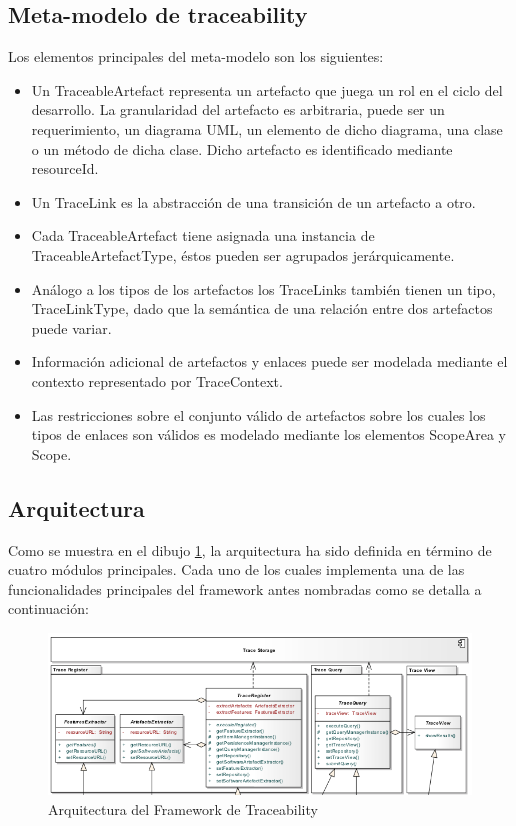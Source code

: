 \documentclass[a4paper,12pt,oneside]{book}
\begin{document}
\subsection{Meta-modelo de traceability}

Los elementos principales del meta-modelo son los siguientes:

\begin{itemize}
\item     Un TraceableArtefact representa un artefacto que juega un rol en el ciclo del desarrollo. La granularidad del artefacto es arbitraria, puede ser un requerimiento, un diagrama UML, un elemento de dicho diagrama, una clase o un método de dicha clase. Dicho artefacto es identificado mediante resourceId.
\item    Un TraceLink es la abstracción de una transición de un artefacto a otro.
\item    Cada TraceableArtefact tiene asignada una instancia de TraceableArtefactType, éstos pueden ser agrupados jerárquicamente.
 \item   Análogo a los tipos de los artefactos los TraceLinks también tienen un tipo, TraceLinkType, dado que la semántica de una relación entre dos artefactos puede variar.
\item    Información adicional de artefactos y enlaces puede ser modelada mediante el contexto representado por TraceContext.
\item    Las restricciones sobre el conjunto válido de artefactos sobre los cuales los tipos de enlaces son válidos es modelado mediante los elementos ScopeArea y Scope.
\end{itemize}

\subsection{Arquitectura}

Como se muestra en el dibujo \ref{fig:SPLArquitectura}, la arquitectura ha sido definida en término de cuatro módulos principales. Cada uno de los cuales implementa una de las funcionalidades principales del framework antes nombradas como se detalla a continuación:

\begin{figure}[hbtp]
\centering
\includegraphics[scale=.55]{./img/ArquitecturaTraceabilityFramework}
\caption{Arquitectura del Framework de Traceability}
\label{fig:SPLArquitectura}
\end{figure}
\end{document}
